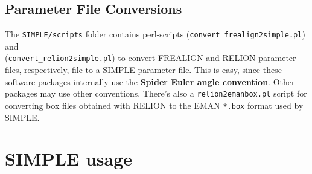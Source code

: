 \documentclass[a4paper,11pt]{article}
\begin{document}
\subsection{Parameter File Conversions}
The \texttt{SIMPLE/scripts} folder contains perl-scripts (\texttt{convert\_frealign2simple.pl}) and\\ (\texttt{convert\_relion2simple.pl}) to convert FREALIGN and RELION parameter files, respectively, file to a SIMPLE parameter file. This is easy, since these software packages internally use the \href{http://spider.wadsworth.org/spider_doc/spider/docs/euler.html}{\textbf{\textcolor{BurntOrange}{Spider Euler angle convention}}}. Other packages may use other conventions. There's also a \texttt{relion2emanbox.pl} script for converting box files obtained with RELION to the EMAN \texttt{*.box} format used by SIMPLE.

\section{SIMPLE usage}
\end{document}
